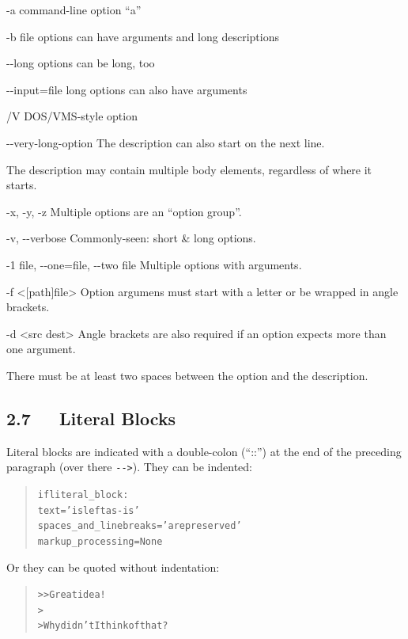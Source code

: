 \documentclass[a4paper]{article}
\providecommand*{\DUoptionlistlabel}[1]{\bfseries #1 \hfill}
\newenvironment{DUoptionlist}{%
    \list{}{\setlength{\labelwidth}{\DUoptionlistindent}
            \setlength{\rightmargin}{1cm}
            \setlength{\leftmargin}{\rightmargin}
            \addtolength{\leftmargin}{\labelwidth}
            \addtolength{\leftmargin}{\labelsep}
            \renewcommand{\makelabel}{\DUoptionlistlabel}}
  }
  {\endlist}
\begin{document}
\begin{DUoptionlist}
\item[-a]  command-line option “a”
\item[-b file]  options can have arguments
and long descriptions
\item[-{}-long]  options can be long, too
\item[-{}-input=file]  long options can also have arguments
\item[/V]  DOS/VMS-style option
\item[-{}-very-long-option]  The description can also start on the next line.

The description may contain multiple body elements,
regardless of where it starts.
\item[-x, -y, -z]  Multiple options are an “option group”.
\item[-v, -{}-verbose]  Commonly-seen: short \& long options.
\item[-1 file, -{}-one=file, -{}-two file]  Multiple options with arguments.
\item[-f <{[}path{]}file>]  Option argumens must start with a letter
or be wrapped in angle brackets.
\item[-d <src dest>]  Angle brackets are also required if an
option expects more than one argument.
\end{DUoptionlist}

There must be at least two spaces between the option and the
description.


\subsection{2.7   Literal Blocks%
  \label{literal-blocks}%
}

Literal blocks are indicated with a double-colon (“::”) at the end of
the preceding paragraph (over there \texttt{-{}->}).  They can be indented:

\begin{quote}
\begin{alltt}
if literal_block:
    text = 'is left as-is'
    spaces_and_linebreaks = 'are preserved'
    markup_processing = None
\end{alltt}
\end{quote}

Or they can be quoted without indentation:

\begin{quote}
\begin{alltt}
>> Great idea!
>
> Why didn't I think of that?
\end{alltt}
\end{quote}
\end{document}
